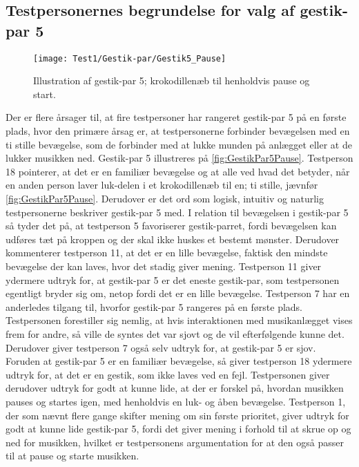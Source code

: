 \subsection{Testpersonernes begrundelse for valg af gestik-par 5}
\label{TestresultaterValgAfGestikkerBegrundelseGP5}
%
\begin{figure}[H]
	\centering
	\texttt{[image: Test1/Gestik-par/Gestik5\_Pause]}
	\caption{Illustration af gestik-par 5; krokodillenæb til henholdvis pause og start.}
	\label{fig:GestikPar5Pause}
\end{figure}
\noindent
%
Der er flere årsager til, at fire testpersoner har rangeret gestik-par 5 på en første plads, hvor den primære årsag er, at testpersonerne forbinder bevægelsen med en ti stille bevægelse, som de forbinder med at lukke munden på anlægget eller at de lukker musikken ned. Gestik-par 5 illustreres på \autoref{fig:GestikPar5Pause}. Testperson 18 pointerer, at det er en familiær bevægelse og at alle ved hvad det betyder, når en anden person laver luk-delen i et krokodillenæb til en; ti stille, jævnfør \autoref{fig:GestikPar5Pause}. Derudover er det ord som logisk, intuitiv og naturlig testpersonerne beskriver gestik-par 5 med. I relation til bevægelsen i gestik-par 5 så tyder det på, at testperson 5 favoriserer gestik-parret, fordi bevægelsen kan udføres tæt på kroppen og der skal ikke huskes et bestemt mønster. Derudover kommenterer testperson 11, at det er en lille bevægelse, faktisk den mindste bevægelse der kan laves, hvor det stadig giver mening. Testperson 11 giver ydermere udtryk for, at gestik-par 5 er det eneste gestik-par, som testpersonen egentligt bryder sig om, netop fordi det er en lille bevægelse. Testperson 7 har en anderledes tilgang til, hvorfor gestik-par 5 rangeres på en første plads. Testpersonen forestiller sig nemlig, at hvis interaktionen med musikanlægget vises frem for andre, så ville de syntes det var sjovt og de vil efterfølgende kunne det. Derudover giver testperson 7 også selv udtryk for, at gestik-par 5 er sjov. Foruden at gestik-par 5 er en familiær bevægelse, så giver testperson 18 ydermere udtryk for, at det er en gestik, som ikke laves ved en fejl. Testpersonen giver derudover udtryk for godt at kunne lide, at der er forskel på, hvordan musikken pauses og startes igen, med henholdvis en luk- og åben bevægelse. Testperson 1, der som nævnt flere gange skifter mening om sin første prioritet, giver udtryk for godt at kunne lide gestik-par 5, fordi det giver mening i forhold til at skrue op og ned for musikken, hvilket er testpersonens argumentation for at den også passer til at pause og starte musikken.
%

